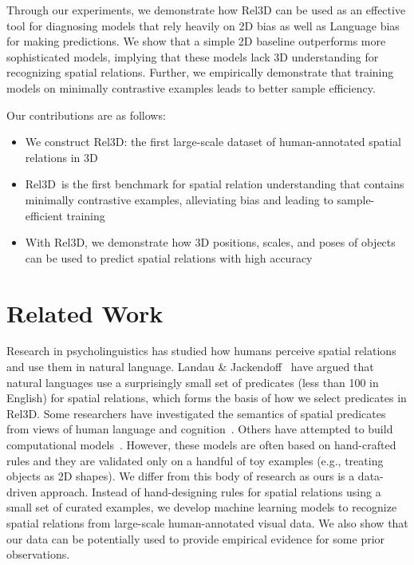 \documentclass{article}
\newcommand{\smallsec}[1]{\noindent {\bf #1.}}
\newcommand\datasetname{Rel3D}
\begin{document}
Through our experiments, we demonstrate how {\datasetname } can be used as an effective tool for diagnosing models that rely heavily on 2D bias as well as Language bias for making predictions. We show that a simple 2D baseline outperforms more sophisticated models, implying that these models lack 3D understanding for recognizing spatial relations. Further, we empirically demonstrate that training models on minimally contrastive examples leads to better sample efficiency.


Our contributions are as follows:
\begin{itemize}[noitemsep,topsep=-1pt,leftmargin=*]
    \item We construct \datasetname: the first large-scale dataset of human-annotated spatial relations in 3D
    \item \datasetname~is the first benchmark for spatial relation understanding that contains minimally contrastive examples, alleviating bias and leading to sample-efficient training
    \item With \datasetname, we demonstrate how 3D positions, scales, and poses of objects can be used to predict spatial relations with high accuracy
\end{itemize}


\section{Related Work}


\smallsec{Spatial relations} Research in psycholinguistics has studied how humans perceive spatial relations and use them in natural language. Landau \& Jackendoff~\cite{landau1993and} have argued that natural languages use a surprisingly small set of predicates (less than 100 in English) for spatial relations, which forms the basis of how we select predicates in \datasetname. Some researchers have investigated the semantics of spatial predicates from views of human language and cognition~\cite{freeman1975modelling,talmy1983language,herskovits1985semantics,coventry2004saying}. Others have attempted to build computational models~\cite{gapp1995angle,keller1996learning,bloch1999fuzzy,kelleher2006proximity,matsakis2001linguistic}. However, these models are often based on hand-crafted rules and they are validated only on a handful of toy examples (e.g., treating objects as 2D shapes). We differ from this body of research as ours is a data-driven approach. Instead of hand-designing rules for spatial relations using a small set of curated examples, we develop machine learning models to recognize spatial relations from large-scale human-annotated visual data. We also show that our data can be potentially used to provide empirical evidence for some prior observations.
\end{document}

